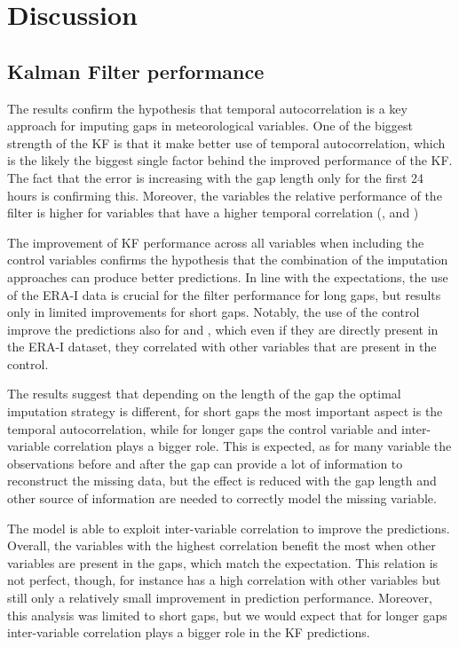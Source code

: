 \documentclass{article}
\let\Oldsection\section
\renewcommand{\section}{\FloatBarrier\Oldsection}
\let\Oldsubsection\subsection
\renewcommand{\subsection}{\FloatBarrier\Oldsubsection}
\begin{document}
\section{Discussion}




\subsection{Kalman Filter performance}

The results confirm the hypothesis that temporal autocorrelation is a key approach for imputing gaps in meteorological variables. One of the biggest strength of the KF is that it make better use of temporal autocorrelation, which is the likely the biggest single factor behind the improved performance of the KF. The fact that the error is increasing with the gap length only for the first 24 hours is confirming this. Moreover, the variables the relative performance of the filter is higher for variables that have a higher temporal correlation (,  and )

The improvement of KF performance across all variables when including the control variables confirms the hypothesis that the combination of the imputation approaches can produce better predictions. In line with the expectations, the use of the ERA-I data is crucial for the filter performance for long gaps, but results only in limited improvements for short gaps. Notably, the use of the control improve the predictions also for  and , which even if they are directly present in the ERA-I dataset, they correlated with other variables that are present in the control.

The results suggest that depending on the length of the gap the optimal imputation strategy is different, for short gaps the most important aspect is the temporal autocorrelation, while for longer gaps the control variable and inter-variable correlation plays a bigger role. This is expected, as for many variable the observations before and after the gap can provide a lot of information to reconstruct the missing data, but the effect is reduced with the gap length and other source of information are needed to correctly model the missing variable.

The model is able to exploit inter-variable correlation to improve the predictions. Overall, the variables with the highest correlation benefit the most when other variables are present in the gaps, which match the expectation.
This relation is not perfect, though, for instance  has a high correlation with other variables but still only a relatively small improvement in prediction performance.
Moreover, this analysis was limited to short gaps, but we would expect that for longer gaps inter-variable correlation plays a bigger role in the KF predictions.
\end{document}
